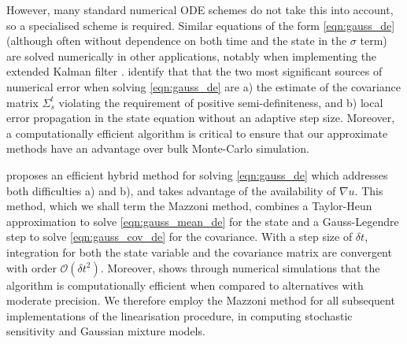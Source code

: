 However, many standard numerical ODE schemes do not take this into account, so a specialised scheme is required.
Similar equations of the form \cref{eqn:gauss_de} (although often without dependence on both time and the state in the \(\sigma\) term) are solved numerically in other applications, notably when implementing the extended Kalman filter \citep{Jazwinski_2014_StochasticProcessesFiltering, KulikovaKulikov_2014_AdaptiveODESolvers}.
\citet{KulikovaKulikov_2014_AdaptiveODESolvers} identify that that the two most significant sources of numerical error when solving \cref{eqn:gauss_de} are a) the estimate of the covariance matrix \(\Sigma_s^t\) violating the requirement of positive semi-definiteness, and b) local error propagation in the state equation without an adaptive step size.
Moreover, a computationally efficient algorithm is critical to ensure that our approximate methods have an advantage over bulk Monte-Carlo simulation.

\citet{Mazzoni_2008_ComputationalAspectsContinuous} proposes an efficient hybrid method for solving \cref{eqn:gauss_de} which addresses both difficulties a) and b), and takes advantage of the availability of \(\nabla u\).
This method, which we shall term the Mazzoni method, combines a Taylor-Heun approximation to solve \cref{eqn:gauss_mean_de} for the state and a Gauss-Legendre step to solve \cref{eqn:gauss_cov_de} for the covariance.
With a step size of \(\delta t\), integration for both the state variable and the covariance matrix are convergent with order \(\mathcal{O}\!\left(\delta t^2\right)\).
Moreover, \citet{Mazzoni_2008_ComputationalAspectsContinuous} shows through numerical simulations that the algorithm is computationally efficient when compared to alternatives with moderate precision.
We therefore employ the Mazzoni method for all subsequent implementations of the linearisation procedure, in computing stochastic sensitivity and Gaussian mixture models.

